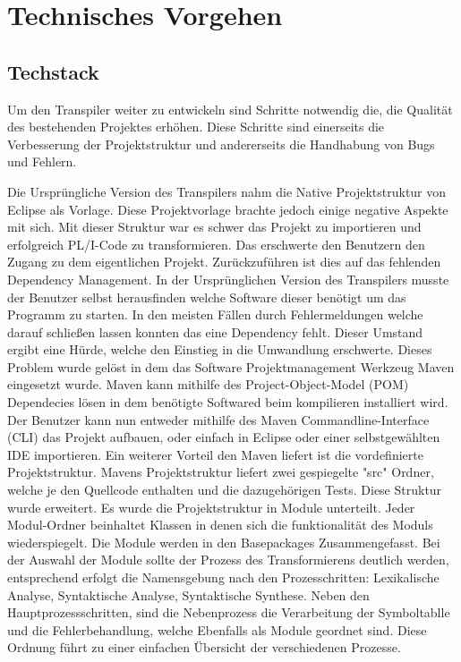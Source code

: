 \section{Technisches Vorgehen}
\subsection{Techstack}
Um den Transpiler weiter zu entwickeln sind Schritte notwendig die, die Qualität des bestehenden Projektes erhöhen. Diese Schritte sind einerseits die Verbesserung der Projektstruktur und andererseits die Handhabung von Bugs und Fehlern.

Die Ursprüngliche Version des Transpilers nahm die Native Projektstruktur von Eclipse als Vorlage. Diese Projektvorlage brachte jedoch einige negative Aspekte mit sich. Mit dieser Struktur war es schwer das Projekt zu importieren und erfolgreich PL/I-Code zu transformieren. Das erschwerte den Benutzern den Zugang zu dem eigentlichen Projekt. 
Zurückzuführen ist dies auf das fehlenden Dependency Management. In der Ursprünglichen Version des Transpilers musste der Benutzer selbst herausfinden welche Software dieser benötigt um das Programm zu starten. In den meisten Fällen durch Fehlermeldungen welche darauf schließen lassen konnten das eine Dependency fehlt. Dieser Umstand ergibt eine Hürde, welche den Einstieg in die Umwandlung erschwerte. 
Dieses Problem wurde gelöst in dem das Software Projektmanagement Werkzeug Maven eingesetzt wurde. Maven kann mithilfe des Project-Object-Model (POM) Dependecies lösen in dem benötigte Softwared beim kompilieren installiert wird. Der Benutzer kann nun entweder mithilfe des Maven Commandline-Interface (CLI) das Projekt aufbauen, oder einfach in Eclipse oder einer selbstgewählten IDE importieren.
Ein weiterer Vorteil den Maven liefert ist die vordefinierte Projektstruktur. Mavens Projektstruktur liefert zwei gespiegelte "src" Ordner, welche je den Quellcode enthalten und die dazugehörigen Tests. Diese Struktur wurde erweitert. Es wurde die Projektstruktur in Module unterteilt. Jeder Modul-Ordner beinhaltet Klassen in denen sich die funktionalität des Moduls wiederspiegelt. Die Module werden in den Basepackages Zusammengefasst. Bei der Auswahl der Module sollte der Prozess des Transformierens deutlich werden, entsprechend erfolgt die Namensgebung nach den Prozesschritten: Lexikalische Analyse, Syntaktische Analyse, Syntaktische Synthese. Neben den Hauptprozessschritten, sind die Nebenprozess die Verarbeitung der Symboltablle und die Fehlerbehandlung, welche Ebenfalls als Module geordnet sind. Diese Ordnung führt zu einer einfachen Übersicht der verschiedenen Prozesse.

